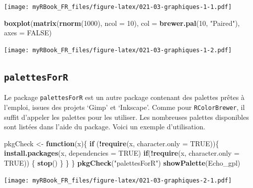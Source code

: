 \documentclass[]{book}
\newenvironment{Shaded}{\begin{snugshade}}{\end{snugshade}}
\newcommand{\ControlFlowTok}[1]{\textcolor[rgb]{0.13,0.29,0.53}{\textbf{#1}}}
\newcommand{\DataTypeTok}[1]{\textcolor[rgb]{0.13,0.29,0.53}{#1}}
\newcommand{\DecValTok}[1]{\textcolor[rgb]{0.00,0.00,0.81}{#1}}
\newcommand{\KeywordTok}[1]{\textcolor[rgb]{0.13,0.29,0.53}{\textbf{#1}}}
\newcommand{\NormalTok}[1]{#1}
\newcommand{\OperatorTok}[1]{\textcolor[rgb]{0.81,0.36,0.00}{\textbf{#1}}}
\newcommand{\OtherTok}[1]{\textcolor[rgb]{0.56,0.35,0.01}{#1}}
\newcommand{\StringTok}[1]{\textcolor[rgb]{0.31,0.60,0.02}{#1}}
\begin{document}
\texttt{[image: myRBook\_FR\_files/figure-latex/021-03-graphiques-1-1.pdf]}

\begin{Shaded}
\begin{Highlighting}[]
\KeywordTok{boxplot}\NormalTok{(}\KeywordTok{matrix}\NormalTok{(}\KeywordTok{rnorm}\NormalTok{(}\DecValTok{1000}\NormalTok{), }\DataTypeTok{ncol =} \DecValTok{10}\NormalTok{), }
  \DataTypeTok{col =} \KeywordTok{brewer.pal}\NormalTok{(}\DecValTok{10}\NormalTok{, }\StringTok{"Paired"}\NormalTok{), }\DataTypeTok{axes =} \OtherTok{FALSE}\NormalTok{)}
\end{Highlighting}
\end{Shaded}

\texttt{[image: myRBook\_FR\_files/figure-latex/021-03-graphiques-1-2.pdf]}

\hypertarget{palettesforr}{%
\subsection{\texorpdfstring{\texttt{palettesForR}}{palettesForR}}\label{palettesforr}}

Le package \texttt{palettesForR} est un autre package contenant des palettes prêtes à l'emploi, issues des projets `Gimp' et `Inkscape'. Comme pour \texttt{RColorBrewer}, il suffit d'appeler les palettes pour les utiliser. Les nombreuses palettes disponibles sont listées dans l'aide du package. Voici un exemple d'utilisation.

\begin{Shaded}
\begin{Highlighting}[]
\NormalTok{pkgCheck <-}\StringTok{ }\ControlFlowTok{function}\NormalTok{(x)\{ }
    \ControlFlowTok{if}\NormalTok{ (}\OperatorTok{!}\KeywordTok{require}\NormalTok{(x, }\DataTypeTok{character.only =} \OtherTok{TRUE}\NormalTok{))\{}
        \KeywordTok{install.packages}\NormalTok{(x, }\DataTypeTok{dependencies =} \OtherTok{TRUE}\NormalTok{)}
        \ControlFlowTok{if}\NormalTok{(}\OperatorTok{!}\KeywordTok{require}\NormalTok{(x, }\DataTypeTok{character.only =} \OtherTok{TRUE}\NormalTok{)) \{}
            \KeywordTok{stop}\NormalTok{()}
\NormalTok{        \}}
\NormalTok{    \}}
\NormalTok{\}}
\KeywordTok{pkgCheck}\NormalTok{(}\StringTok{"palettesForR"}\NormalTok{)}
\KeywordTok{showPalette}\NormalTok{(Echo_gpl)}
\end{Highlighting}
\end{Shaded}

\texttt{[image: myRBook\_FR\_files/figure-latex/021-03-graphiques-2-1.pdf]}
\end{document}
